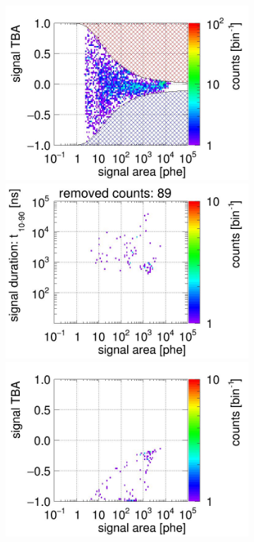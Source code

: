 \begin{landscape}
\begin{figure}[!p]
\begin{subfigure}[t]{0.32\textwidth}
			\includegraphics[width=\figurewidth,clip,trim={0 98 0 40}]{Figures/GasTest/CutsValid/res64767/tbapa08Vecfig64767.jpg}
			\includegraphics[width=\figurewidth,clip,trim={0 98 0 15}]{Figures/GasTest/CutsValid/res64767/pdpaX08Vecfig64767.jpg}
			\includegraphics[width=\figurewidth,clip,trim={0 8 0 40}]{Figures/GasTest/CutsValid/res64767/tbapaX08Vecfig64767.jpg}

\end{subfigure}
\end{figure}
\end{landscape}
